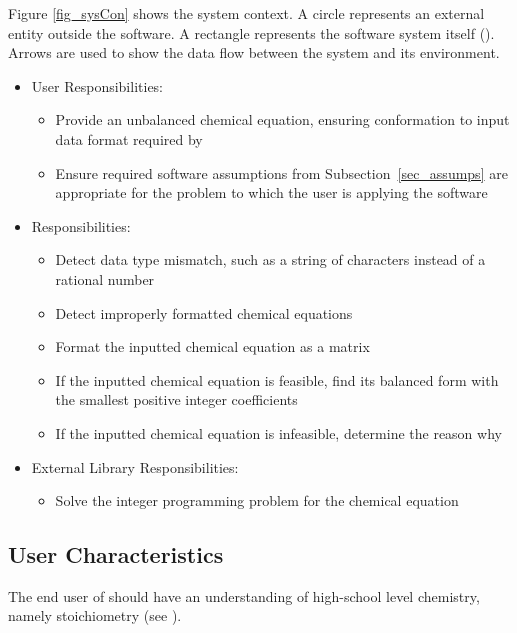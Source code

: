 \documentclass[12pt]{article}
\begin{document}
Figure \ref{fig_sysCon} shows the system context. A circle represents an
external entity outside the software. A rectangle represents the software system
itself (\progname{}). Arrows are used to show the data flow between the system
and its environment.

\begin{itemize}
  \item User Responsibilities:
        \begin{itemize}
          \item Provide an unbalanced chemical equation, ensuring conformation
                to input data format required by \progname{}
          \item Ensure required software assumptions from
                Subsection~\ref{sec_assumps} are appropriate for the problem to
                which the user is applying the software
        \end{itemize}
  \item \progname{} Responsibilities:
        \begin{itemize}
          \item Detect data type mismatch, such as a string of characters
                instead of a rational number
          \item Detect improperly formatted chemical equations
          \item Format the inputted chemical equation as a matrix
          \item If the inputted chemical equation is feasible, find its
                balanced form with the smallest positive integer coefficients
          \item If the inputted chemical equation is infeasible, determine the
                reason why
        \end{itemize}
  \item External Library Responsibilities:
        \begin{itemize}
          \item Solve the integer programming problem for the chemical equation
        \end{itemize}
\end{itemize}

\subsection{User Characteristics} \label{sec_userChars}

The end user of \progname{} should have an understanding of high-school level
chemistry, namely stoichiometry (see ).
\end{document}
